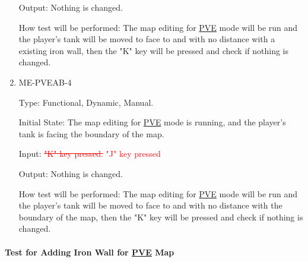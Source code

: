 \documentclass[12pt, titlepage]{article}
\begin{document}
\begin{enumerate}
Output: Nothing is changed.
					
How test will be performed: The map editing for \underline{PVE} mode will be run and the player's tank will be moved to face to and with no distance with a existing iron wall, then the "K" key will be pressed and check if nothing is changed.

\item{ME-PVEAB-4\\}

Type: Functional, Dynamic, Manual.
					
Initial State: The map editing for \underline{PVE} mode is running, and the player's tank is facing the boundary of the map.
					
Input: \textcolor{red}{\sout{"K" key pressed.}} \textcolor{red}{"J" key pressed}
					
Output: Nothing is changed.
					
How test will be performed: The map editing for \underline{PVE} mode will be run and the player's tank will be moved to face to and with no distance with the boundary of the map, then the "K" key will be pressed and check if nothing is changed.

\end{enumerate}

\paragraph{Test for Adding Iron Wall for \underline{PVE} Map}
\end{document}
